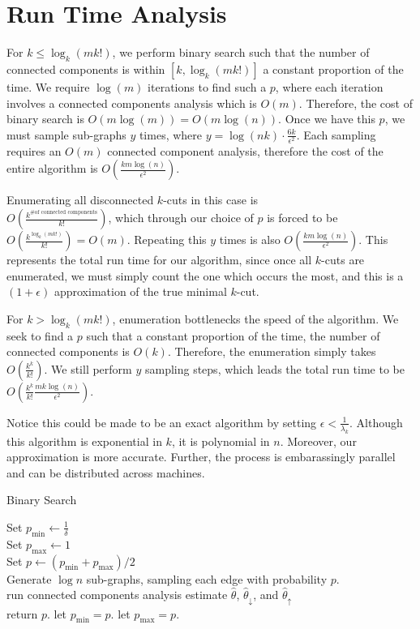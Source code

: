 \documentclass{acm_proc_article-sp}
\begin{document}
\section{Run Time Analysis}

For $k \leq \log_k(mk!)$, we perform binary search such that the number of connected components is within $[k, \log_k(mk!)]$ a constant proportion of the time. We require $\log(m)$ iterations to find such a $p$, where each iteration involves a connected components analysis which is $O(m)$. Therefore, the cost of binary search is $O(m \log(m)) = O(m \log(n))$. Once we have this $p$, we must sample sub-graphs $y$ times, where $y = \log(nk) \cdot \frac{6k}{\epsilon^2}$. Each sampling requires an $O(m)$ connected component analysis, therefore the cost of the entire algorithm is $O(\frac{km \log(n)}{\epsilon^2})$.

Enumerating all disconnected $k$-cuts in this case is \\ $O(\frac{k^{\text{\# of connected components}}}{k!})$, which through our choice of $p$ is forced to be $O(\frac{k^{\log_k(mk!)}}{k!}) = O(m)$. Repeating this $y$ times is also $O(\frac{km \log(n)}{\epsilon^2})$. This represents the total run time for our algorithm, since once all $k$-cuts are enumerated, we must simply count the one which occurs the most, and this is a $(1+\epsilon)$ approximation of the true minimal $k$-cut.

For $k > \log_k(mk!)$, enumeration bottlenecks the speed of the algorithm. We seek to find a $p$ such that a constant proportion of the time, the number of connected components is $O(k)$. Therefore, the enumeration simply takes $O(\frac{k^k}{k!})$. We still perform $y$ sampling steps, which leads the total run time to be $O(\frac{k^k}{k!} \frac{m k \log(n)}{\epsilon^2})$.

Notice this could be made to be an exact algorithm by setting $\epsilon < \frac{1}{\lambda_k}$. Although this algorithm is exponential in $k$, it is polynomial in $n$. Moreover, our approximation is more accurate. Further, the process is embarassingly parallel and can be distributed across machines.

\LinesNumbered
\begin{algorithm}
\caption{Binary Search}
Set $p_{\text{min}} \leftarrow \frac{1}{\delta}$ \\
Set $p_{\text{max}} \leftarrow 1$ \\
 {
  Set $p \leftarrow (p_{\text{min}} + p_{\text{max}})/2$ \\
  Generate $\log n$ sub-graphs, sampling each edge with probability   $p$. \\
   {
    run connected components analysis
  }
  estimate $\hat{\theta}$, $\hat{\theta}_{\downarrow}$, and $\hat{\theta}_{\uparrow}$ \\
   {
    return $p$.
  }
  \uElseIf{$\hat{\theta}_{\downarrow} > \hat{\theta}_{\uparrow}$} {
    let $p_{\text{min}} = p$.
  }
  \ElseIf{$\hat{\theta}_{\uparrow} > \hat{\theta}_{\downarrow}$} {
    let $p_{\text{max}} = p$.
  }
}
\end{algorithm}
\end{document}
